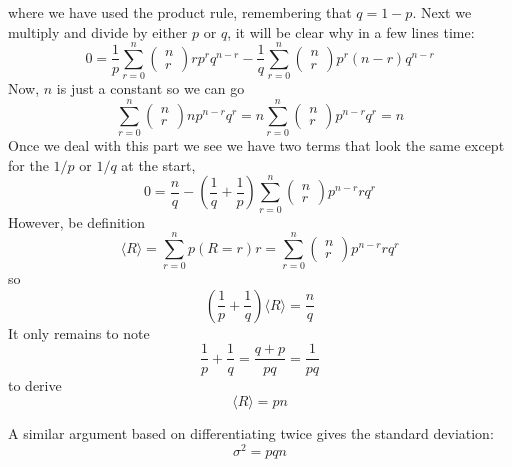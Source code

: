 \documentclass[11pt,a4paper]{scrartcl}
\begin{document}
where we have used the product rule, remembering that $q=1-p$. Next we multiply and divide by either $p$ or $q$, it will be clear why in a few lines time:
\begin{equation}
0=\frac{1}{p}\sum_{r=0}^n \left(\begin{array}{c}n\\r\end{array}\right)rp^rq^{n-r}
-\frac{1}{q}\sum_{r=0}^n \left(\begin{array}{c}n\\r\end{array}\right)p^r(n-r)q^{n-r}
\end{equation}
Now, $n$ is just a constant so we can go
\begin{equation}
\sum_{r=0}^n \left(\begin{array}{c}n\\r\end{array}\right)np^{n-r}q^r=n\sum_{r=0}^n \left(\begin{array}{c}n\\r\end{array}\right)p^{n-r}q^r=n
\end{equation}
Once we deal with this part we see we have two terms that look the same except for the $1/p$ or $1/q$ at the start, 
\begin{equation}
0=\frac{n}{q}-\left(\frac{1}{q}+\frac{1}{p}\right)\sum_{r=0}^n \left(\begin{array}{c}n\\r\end{array}\right)p^{n-r}rq^r
\end{equation}
However, be definition
\begin{equation}
\langle R\rangle=\sum_{r=0}^n p(R=r)r=\sum_{r=0}^n \left(\begin{array}{c}n\\r\end{array}\right)p^{n-r}rq^r
\end{equation}
so
\begin{equation}
\left(\frac{1}{p}+\frac{1}{q}\right)\langle R\rangle=\frac{n}{q}
\end{equation}
It only remains to note
\begin{equation}
\frac{1}{p}+\frac{1}{q}=\frac{q+p}{pq}=\frac{1}{pq}
\end{equation}
to derive
\begin{equation}
\langle R\rangle=pn
\end{equation}

A similar argument based on differentiating twice gives the standard
deviation:
\begin{equation}
\sigma^2=pqn
\end{equation}
\end{document}
